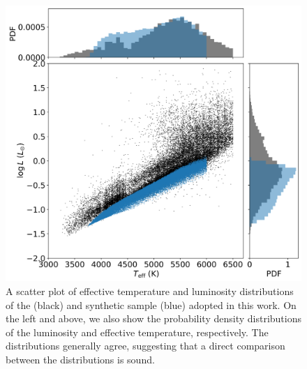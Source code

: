 \begin{figure}
\centering
 \includegraphics[width=\textwidth]{Figures/rot_gap_figures/compar_dist.png}
 \caption[A comparison between the effective temperature and luminosity distributions of the \citet{mcquillan_rotation_2014} and synthetic sample adopted in this work. ]{A scatter plot of effective temperature and luminosity distributions of the \citet{mcquillan_rotation_2014} (black) and synthetic sample (blue) adopted in this work. On the left and above, we also show the probability density distributions of the luminosity and effective temperature, respectively. The distributions generally agree, suggesting that a direct comparison between the distributions is sound.}
 \label{fig:compar_teff_logl}
\end{figure}

